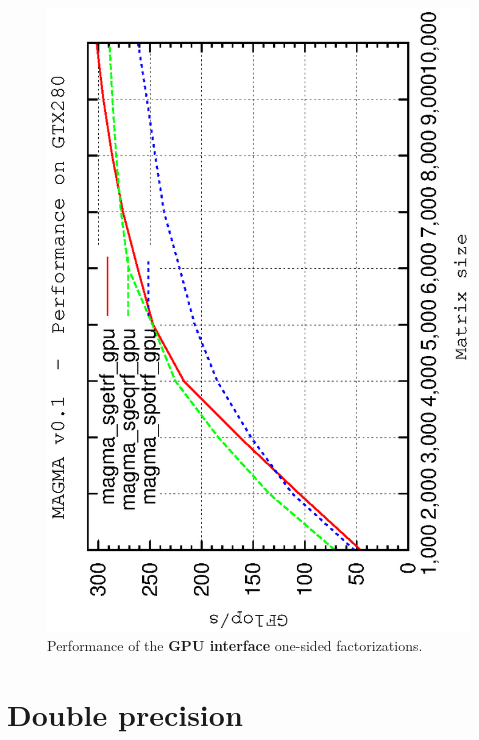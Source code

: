 \documentclass[10pt]{book}
\begin{document}
       \begin{figure}[!ht]
          \centering
          \hspace{-5mm}
          \includegraphics[angle=-90,scale=0.7]{sp-gpu.ps}
          \caption{Performance of the {\bf GPU interface}
                   one-sided factorizations.}
       \label{sp-gpu-performance}
       \end{figure}
\newpage
\section{Double precision}
\end{document}
